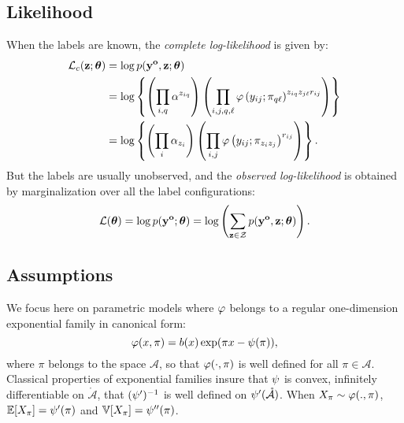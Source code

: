 \documentclass[]{imsart}
\newcommand{\1}{\mathds{1}}
\numberwithin{equation}{section}
\theoremstyle{plain}
\theoremstyle{remark}
\begin{document}
\subsection{Likelihood}
When the labels are known, the {\em complete log-likelihood} is given by:
\begin{equation}
  \label{eq:log-vraisemblance-complete}
  \begin{aligned}
    \Lc(\bz;\btheta)&= \log\prob(\byo,\bz;\btheta)\\
    &= \log\left\{ \left(\prodiq{\pii^{\ziq}}\right)\left(\prodijql{\dens\left(\yij;\piql\right)^{\ziq\zjl\rrij}}\right) \right\}\\
    &= \log\left\{ \left(\prodi{\pii_{\zi}}\right)\left(\prodij{\dens\left(\yij;\pi_{\zi\zj}\right)^{\rrij}}\right) \right\}.	\\
  \end{aligned}
\end{equation}
But the labels are usually unobserved, and the {\em observed log-likelihood} is obtained by marginalization over all the label configurations:
\begin{equation}
  \label{eq:log-vraisemblance-observee}
  \LL(\btheta)=\log\prob(\byo;\btheta) = \log \left( \sum_{\bz \in \mcZ}\prob(\byo,\bz;\btheta) \right).
\end{equation}

\subsection{Assumptions}\label{sec:assumptions}
We focus here on parametric models where $\varphi$ belongs to a regular one-dimension exponential family in canonical form:
\begin{equation}
  \dens(x, \pi) = b(x)\exp(\pi x - \norm(\pi)),
\end{equation}
where $\pi$ belongs to the space  $\mathcal{A}$, so that $\varphi(\cdot, \pi)$ is well defined for all $\pi \in \mathcal{A}$. Classical properties of exponential families insure that $\psi$ is convex, infinitely differentiable on $\mathring{\mathcal{A}}$, that $(\psi')^{-1}$ is well defined on $\psi'(\mathring{\mathcal{A}})$. When $X_{\pi} \sim \varphi(., \pi)$, $\mathbb{E}[X_\pi] = \psi'(\pi)$ and $\mathbb{V}[X_{\pi}] = \psi''(\pi)$. \\
\end{document}
